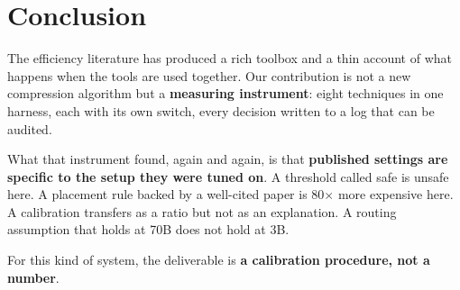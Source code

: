 \documentclass[11pt,a4paper]{article}
\begin{document}
\section{Conclusion}

The efficiency literature has produced a rich toolbox and a thin account of what
happens when the tools are used together. Our contribution is not a new compression
algorithm but a \textbf{measuring instrument}: eight techniques in one harness, each
with its own switch, every decision written to a log that can be audited.

What that instrument found, again and again, is that \textbf{published settings are
specific to the setup they were tuned on}. A threshold called safe is unsafe here. A
placement rule backed by a well-cited paper is 80$\times$ more expensive here. A
calibration transfers as a ratio but not as an explanation. A routing assumption that
holds at 70B does not hold at 3B.

For this kind of system, the deliverable is \textbf{a calibration procedure, not a
number}.
\end{document}
